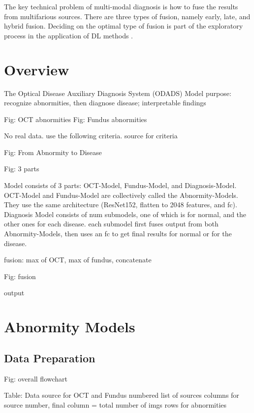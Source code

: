 \documentclass{article}
\begin{document}
		The key technical problem of multi-modal diagnosis is how to fuse the results from multifarious sources.  There are three types of fusion, namely early, late, and hybrid fusion.  Deciding on the optimal type of fusion is part of the exploratory process in the application of DL methods \autocite{Ichhpujani_Thakur_2021}.
		
		
	
	\section{Overview}
		
		The Optical Disease Auxiliary Diagnosis System (ODADS)
		Model purpose: recognize abnormities, then diagnose disease; 
			interpretable findings
		
		
		
		Fig: OCT abnormities
		Fig: Fundus abnormities
		
		No real data. use the following criteria. source for criteria
		
		Fig: From Abnormity to Disease
		
		Fig: 3 parts
		
		Model consists of 3 parts: OCT-Model, Fundus-Model, and Diagnosis-Model. OCT-Model and Fundus-Model are collectively called the Abnormity-Models. They use the same architecture (ResNet152, flatten to 2048 features, and fc). Diagnosis Model consists of num submodels, one of which is for normal, and the other ones for each disease. each submodel first fuses output from both Abnormity-Models, then uses an fc to get final results for normal or for the disease. 
		
		fusion: max of OCT, max of fundus, concatenate
		
		Fig: fusion
		
		output
		
	\section{Abnormity Models}
	
		\subsection{Data Preparation}
			
			Fig: overall flowchart
			
			Table: Data source for OCT and Fundus
				numbered list of sources
				columns for source number, final column = total number of imgs
				rows for abnormities
			
\end{document}
